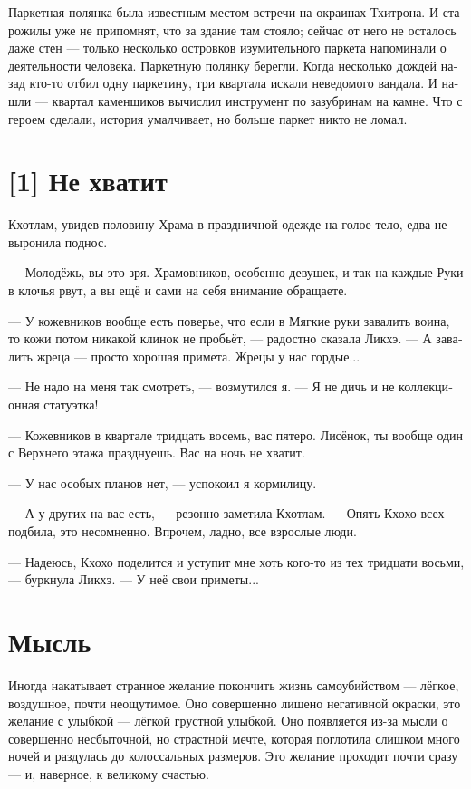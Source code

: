 \documentclass[a4paper,12pt,fleqn]{book}\usepackage{polyglossia}\setdefaultlanguage[babelshorthands=true]{russian}\setotherlanguage{english}\defaultfontfeatures{Ligatures=TeX,Mapping=tex-text}\usepackage{xcolor}\newcommand{\ml}[3]{#2}
\begin{document}
{Паркетная полянка была известным местом встречи на окраинах Тхитрона.
И старожилы уже не припомнят, что за здание там стояло;
сейчас от него не осталось даже стен --- только несколько островков изумительного паркета напоминали о деятельности человека.
Паркетную полянку берегли.
Когда несколько дождей назад кто-то отбил одну паркетину, три квартала искали неведомого вандала.
И нашли --- квартал каменщиков вычислил инструмент по зазубринам на камне.
Что с героем сделали, история умалчивает, но больше паркет никто не ломал.

\section{[1] Не хватит}

Кхотлам, увидев половину Храма в праздничной одежде на голое тело, едва не выронила поднос.

--- Молодёжь, вы это зря.
Храмовников, особенно девушек, и так на каждые Руки в клочья рвут, а вы ещё и сами на себя внимание обращаете.

--- У кожевников вообще есть поверье, что если в Мягкие руки завалить воина, то кожи потом никакой клинок не пробьёт, --- радостно сказала Ликхэ.
--- А завалить жреца --- просто хорошая примета.
Жрецы у нас гордые...

--- Не надо на меня так смотреть, --- возмутился я.
--- Я не дичь и не коллекционная статуэтка!

--- Кожевников в квартале тридцать восемь, вас пятеро.
Лисёнок, ты вообще один с Верхнего этажа празднуешь.
Вас на ночь не хватит.

--- У нас особых планов нет, --- успокоил я кормилицу.

--- А у других на вас есть, --- резонно заметила Кхотлам.
--- Опять Кхохо всех подбила, это несомненно.
Впрочем, ладно, все взрослые люди.

--- Надеюсь, Кхохо поделится и уступит мне хоть кого-то из тех тридцати восьми, --- буркнула Ликхэ.
--- У неё свои приметы...

\section{Мысль}

Иногда накатывает странное желание покончить жизнь самоубийством --- лёгкое, воздушное, почти неощутимое.
Оно совершенно лишено негативной окраски, это желание с улыбкой --- лёгкой грустной улыбкой.
Оно появляется из-за мысли о совершенно несбыточной, но страстной мечте, которая поглотила слишком много ночей и раздулась до колоссальных размеров.
Это желание проходит почти сразу --- и, наверное, к великому счастью.

}
\end{document}
